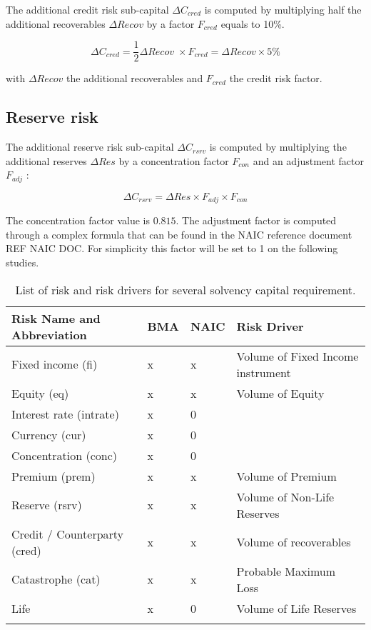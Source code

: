 The additional credit risk sub-capital $\Delta C_{cred}$ is computed by multiplying half the additional recoverables $\Delta Recov$ by a factor $F_{cred}$ equals to 10\%. 

\begin{equation}
	\Delta C_{cred} = \frac{1}{2}\Delta Recov \; \times F_{cred} = \Delta Recov \times 5\%
\end{equation}

with $\Delta Recov$ the additional recoverables and $F_{cred}$ the credit risk factor.


\subsection{Reserve risk}

The additional reserve risk sub-capital $\Delta C_{rsrv}$ is computed by multiplying the additional reserves $\Delta Res$ by a concentration factor $F_{con}$ and an adjustment factor $F_{adj}$ :

\begin{equation}
	\Delta C_{rsrv} = \Delta Res \times F_{adj} \times F_{con}
\end{equation}

The concentration factor value is $0.815$. The adjustment factor is computed through a complex formula that can be found in the NAIC reference document REF NAIC DOC. For simplicity this factor will be set to 1 on the following studies.



\begin{table}
\centering
\begin{tabular}{|l|l|l|l|}
\hline
   \textbf{Risk Name and Abbreviation} & \textbf{BMA} & \textbf{NAIC} & \textbf{Risk Driver} \\ \hline \hline
   Fixed income (fi) & x & x & Volume of Fixed Income instrument\\ \hline
   Equity (eq) & x & x & Volume of Equity \\ \hline
   Interest rate (intrate) & x & 0 & \\ \hline
   Currency (cur) & x & 0 & \\ \hline
   Concentration (conc) & x & 0 & \\ \hline
   Premium (prem) & x & x & Volume of Premium \\ \hline
   Reserve (rsrv) & x & x &  Volume of Non-Life Reserves \\ \hline
   Credit / Counterparty (cred) & x & x & Volume of recoverables\\ \hline
   Catastrophe (cat) & x & x & Probable Maximum Loss\\ \hline
   Life & x & 0 & Volume of Life Reserves\\ \hline
   \label{t:RISK_LIST}
\end{tabular}
   \caption{List of risk and risk drivers for several solvency capital requirement.}
\end{table}




